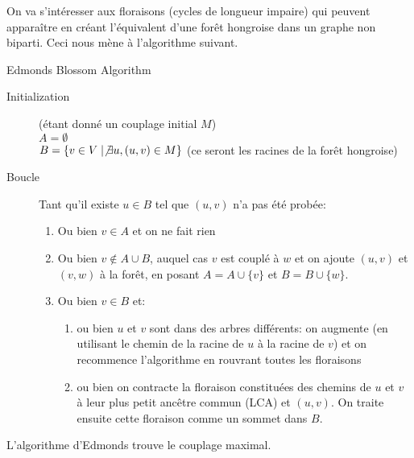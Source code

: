 \documentclass[math, info]{cours}
\begin{document}
On va s'intéresser aux floraisons (cycles de longueur impaire) qui peuvent apparaître en créant l'équivalent d'une forêt hongroise dans un graphe non biparti.
Ceci nous mène à l'algorithme suivant.
\begin{algorithm}
	\caption{Edmonds Blossom Algorithm}
	\begin{description}
		\item[Initialization] (étant donné un couplage initial $M$)\\
			$A = \emptyset$\\
			$B = \left\{v \in V\mid \not\exists u, (u, v)\in M \right\}$ (ce seront les racines de la forêt hongroise)\\
		\item[Boucle] Tant qu'il existe $u \in B$ tel que $(u, v)$ n'a pas été probée:
		\begin{enumerate}
			\item Ou bien $v \in A$ et on ne fait rien
			\item Ou bien $v \notin A \cup B$, auquel cas $v$ est couplé à $w$ et on ajoute $(u, v)$ et $(v, w)$ à la forêt, en posant $A = A \cup \{v\}$ et $B = B \cup \{w\}$.
			\item Ou bien $v \in B$ et:
				\begin{enumerate}
					\item ou bien $u$ et $v$ sont dans des arbres différents: on augmente (en utilisant le chemin de la racine de $u$ à la racine de $v$) et on recommence l'algorithme en rouvrant toutes les floraisons
					\item ou bien on contracte la floraison constituées des chemins de $u$ et $v$ à leur plus petit ancêtre commun (LCA) et $(u, v)$.
						On traite ensuite cette floraison comme un sommet dans $B$.
				\end{enumerate}
		\end{enumerate}
	\end{description}
\end{algorithm}

\begin{thm}
	L'algorithme d'Edmonds trouve le couplage maximal.
	\label{thm:edmondsblossom}
\end{thm}
\end{document}
